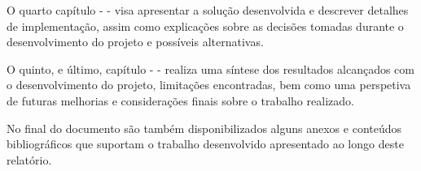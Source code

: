 O quarto capítulo -  - visa apresentar a solução desenvolvida e 
descrever detalhes de implementação, assim como explicações sobre as decisões tomadas durante o
desenvolvimento do projeto e possíveis alternativas.

O quinto, e último, capítulo -  - realiza uma síntese dos resultados 
alcançados com o desenvolvimento do projeto, limitações encontradas, bem como uma perspetiva de 
futuras melhorias e considerações finais sobre o trabalho realizado.

No final do documento são também disponibilizados alguns anexos e conteúdos bibliográficos que 
suportam o trabalho desenvolvido apresentado ao longo deste relatório.

